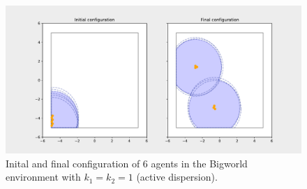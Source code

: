 \begin{figure}[H]
  \centering
  \includegraphics[width=\textwidth]{figs/bigworld_6_agnt_k_1_1_k_2_1_distr.pdf}
  \caption{Inital and final configuration of 6 agents in the Bigworld environment with $k_{1} = k_{2} = 1$ (active dispersion).}
  \label{fig:6_agnt_bw_k_1_1_k_2_1_distr}
\end{figure}
